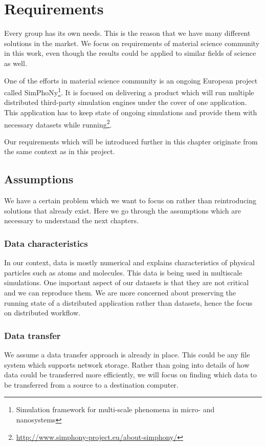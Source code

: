 \chapter{Requirements}
\label{cha:requirements}

Every group has its own needs. 
This is the reason that we have many different solutions in the market.
We focus on requirements of material science community in this work, 
even though the results could be applied to similar fields of science as well. 

One of the efforts in material science community is an ongoing European project called
 SimPhoNy\footnote{Simulation framework for multi-scale phenomena in micro- and nanosystems}.
It is focused on delivering a product which will run multiple distributed third-party simulation engines
under the cover of one application.
This application has to keep state of ongoing simulations and provide them with necessary datasets while 
running\footnote{\url{http://www.simphony-project.eu/about-simphony/}}.

Our requirements which will be introduced further in this chapter originate from the same context as in this project.

\section{Assumptions}
We have a certain problem which we want to focus on rather than reintroducing solutions that already exist. 
Here we go through the assumptions which are necessary to understand the next chapters.

\subsection{Data characteristics}
In our context, data is mostly numerical and explains characteristics of physical particles such as atoms and molecules. 
This data is being used in multiscale simulations. 
One important aspect of our datasets is that they are not critical and we can reproduce them. 
We are more concerned about preserving the running state of a distributed application rather than datasets, 
hence the focus on distributed workflow.

\subsection{Data transfer}
We assume a data transfer approach is already in place.
This could be any file system which supports 
network storage. Rather than going into details of how data could be transferred more efficiently, 
we will focus on finding which data to be transferred from a source to a destination computer.

